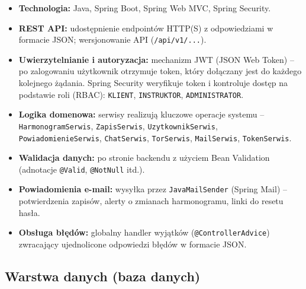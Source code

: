 \documentclass[a4paper,12pt]{article}
\begin{document}
\begin{itemize}
    \item \textbf{Technologia:} Java, Spring Boot, Spring Web MVC, Spring Security.
    \item \textbf{REST API:} udostępnienie endpointów HTTP(S) z odpowiedziami w formacie JSON; wersjonowanie API (\texttt{/api/v1/...}).
    \item \textbf{Uwierzytelnianie i autoryzacja:} mechanizm JWT (JSON Web Token) -- po zalogowaniu użytkownik otrzymuje token, który dołączany jest do każdego kolejnego żądania. Spring Security weryfikuje token i kontroluje dostęp na podstawie roli (RBAC): \texttt{KLIENT}, \texttt{INSTRUKTOR}, \texttt{ADMINISTRATOR}.
    \item \textbf{Logika domenowa:} serwisy realizują kluczowe operacje systemu -- \texttt{HarmonogramSerwis}, \texttt{ZapisSerwis}, \texttt{UzytkownikSerwis}, \texttt{PowiadomienieSerwis}, \texttt{ChatSerwis}, \texttt{TorSerwis}, \texttt{MailSerwis}, \texttt{TokenSerwis}.
    \item \textbf{Walidacja danych:} po stronie backendu z użyciem Bean Validation (adnotacje \texttt{@Valid}, \texttt{@NotNull} itd.).
    \item \textbf{Powiadomienia e-mail:} wysyłka przez \texttt{JavaMailSender} (Spring Mail) -- potwierdzenia zapisów, alerty o zmianach harmonogramu, linki do resetu hasła.
    \item \textbf{Obsługa błędów:} globalny handler wyjątków (\texttt{@ControllerAdvice}) zwracający ujednolicone odpowiedzi błędów w formacie JSON.
\end{itemize}
 
\subsection{Warstwa danych (baza danych)}
 
\end{document}
